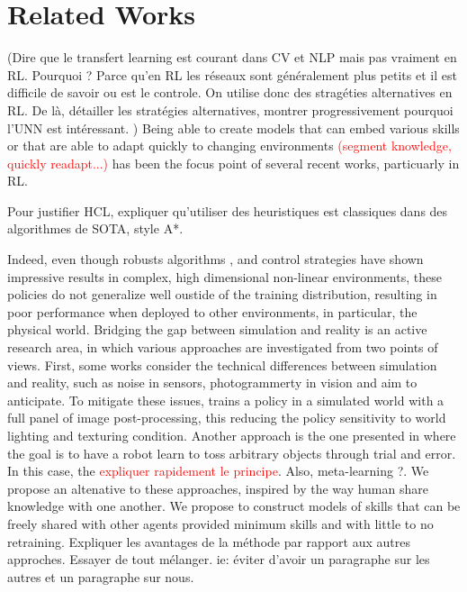 \documentclass[letterpaper, 10 pt, conference]{ieeeconf}  %
\begin{document}
\section{Related Works} %
\label{sec:related_works}
(Dire que le transfert learning est courant dans CV et NLP mais pas vraiment en RL. Pourquoi ? Parce qu'en RL les réseaux sont généralement plus petits et il est difficile de savoir ou est le controle. On utilise donc des stragéties alternatives en RL. De là, détailler les stratégies alternatives, montrer progressivement pourquoi l'UNN est intéressant. )
Being able to create models that can embed various skills or that are able to adapt quickly to changing environments \textcolor{red}{(segment knowledge, quickly readapt...)} has been the focus point of several recent works, particuarly in RL. 

Pour justifier HCL, expliquer qu'utiliser des heuristiques est classiques dans des algorithmes de SOTA, style A*. 

Indeed, even though robusts algorithms \cite{PPO}, \cite{SAC2018} and control strategies have shown impressive results in complex, high dimensional non-linear environments, these policies do not generalize well oustide of the training distribution, resulting in poor performance when deployed to other environments, in particular, the physical world. Bridging the gap between simulation and reality is an active research area, in which various approaches are investigated from two points of views. First, some works consider the technical differences between simulation and reality, such as noise in sensors, photogrammerty in vision and aim to anticipate. To mitigate these issues, \textcolor{green}{\cite{OpenAIDomainRandomization}} trains a policy in a simulated world with a full panel of image post-processing, this reducing the policy sensitivity to world lighting and texturing condition. Another approach is the one presented in \cite{TossingBot} where the goal is to have a robot learn to toss arbitrary objects through trial and error. In this case, the \textcolor{red}{expliquer rapidement le principe}. Also, meta-learning ?. We propose an altenative to these approaches, inspired by the way human share knowledge with one another. We propose to construct models of skills that can be freely shared with other agents provided minimum skills and with little to no retraining. Expliquer les avantages de la méthode par rapport aux autres approches. Essayer de tout mélanger. ie: éviter d'avoir un paragraphe sur les autres et un paragraphe sur nous.  
\end{document}
